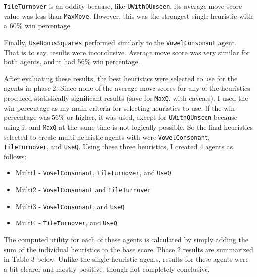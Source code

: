 \documentclass[letterpaper]{article}
\begin{document}
\texttt{TileTurnover} is an oddity because, like \texttt{UWithQUnseen}, its average move score value was less than \texttt{MaxMove}. However, this was the strongest single heuristic with a 60\% win percentage.

Finally, \texttt{UseBonusSquares} performed similarly to the \texttt{VowelConsonant} agent. That is to say, results were inconclusive. Average move score was very similar for both agents, and it had 56\% win percentage.

After evaluating these results, the best heuristics were selected to use for the agents in phase 2. Since none of the average move scores for any of the heuristics produced statistically significant results (save for \texttt{MaxQ}, with caveats), I used the win percentage as my main criteria for selecting heuristics to use. If the win percentage was 56\% or higher, it was used, except for \texttt{UWithQUnseen} because using it and \texttt{MaxQ} at the same time is not logically possible. So the final heuristics selected to create multi-heuristic agents with were \texttt{VowelConsonant}, \texttt{TileTurnover}, and \texttt{UseQ}. Using these three heuristics, I created 4 agents as follows:

 \begin{itemize}
  \setlength{\itemsep}{0cm}%
  \setlength{\parskip}{0cm}%
  \item Multi1 - \texttt{VowelConsonant}, \texttt{TileTurnover}, and \texttt{UseQ}
  \item Multi2 - \texttt{VowelConsonant} and \texttt{TileTurnover}
  \item Multi3 - \texttt{VowelConsonant}, and \texttt{UseQ}
  \item Multi4 - \texttt{TileTurnover}, and \texttt{UseQ}
\end{itemize}

The computed utility for each of these agents is calculated by simply adding the sum of the individual heuristics to the base score. Phase 2 results are summarized in Table 3 below. Unlike the single heuristic agents, results for these agents were a bit clearer and mostly positive, though not completely conclusive. 
\end{document}
